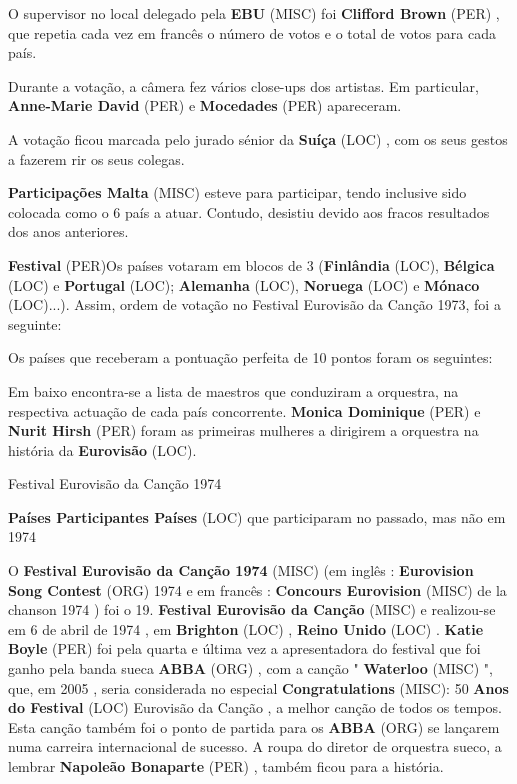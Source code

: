 \documentclass[12pt,a4paper]{article}
\begin{document}
O supervisor no local delegado pela \textbf{EBU} (MISC) foi \textbf{Clifford Brown} (PER) , que repetia cada vez em francês o número de votos e o total de votos para cada país.

Durante a votação, a câmera fez vários close-ups dos artistas. Em particular, \textbf{Anne-Marie David} (PER) e \textbf{Mocedades} (PER) apareceram.

A votação ficou marcada pelo jurado sénior da \textbf{Suíça} (LOC) , com os seus gestos a fazerem rir os seus colegas.



\textbf{Participações Malta} (MISC) esteve para participar, tendo inclusive sido colocada como o 6 país a atuar. Contudo, desistiu devido aos fracos resultados dos anos anteriores.



\textbf{Festival} (PER)Os países votaram em blocos de 3 (\textbf{Finlândia} (LOC), \textbf{Bélgica} (LOC) e \textbf{Portugal} (LOC); \textbf{Alemanha} (LOC), \textbf{Noruega} (LOC) e \textbf{Mónaco} (LOC)...). Assim, ordem de votação no Festival Eurovisão da Canção 1973, foi a seguinte:

Os países que receberam a pontuação perfeita de 10 pontos foram os seguintes:

Em baixo encontra-se a lista de maestros que conduziram a orquestra, na respectiva actuação de cada país concorrente. \textbf{Monica Dominique} (PER) e \textbf{Nurit Hirsh} (PER) foram as primeiras mulheres a dirigirem a orquestra na história da \textbf{Eurovisão} (LOC).



Festival Eurovisão da Canção 1974



\textbf{Países Participantes Países} (LOC) que participaram no passado, mas não em 1974

O \textbf{Festival Eurovisão da Canção 1974} (MISC) (em inglês : \textbf{Eurovision Song Contest} (ORG) 1974 e em francês : \textbf{Concours Eurovision} (MISC) de la chanson 1974 ) foi o 19. \textbf{Festival Eurovisão da Canção} (MISC) e realizou-se em 6 de abril de 1974 , em \textbf{Brighton} (LOC) , \textbf{Reino Unido} (LOC) . \textbf{Katie Boyle} (PER) foi pela quarta e última vez a apresentadora do festival que foi ganho pela banda sueca \textbf{ABBA} (ORG) , com a canção " \textbf{Waterloo} (MISC) ", que, em 2005 , seria considerada no especial \textbf{Congratulations} (MISC): 50 \textbf{Anos do Festival} (LOC) Eurovisão da Canção , a melhor canção de todos os tempos. Esta canção também foi o ponto de partida para os \textbf{ABBA} (ORG) se lançarem numa carreira internacional de sucesso. A roupa do diretor de orquestra sueco, a lembrar \textbf{Napoleão Bonaparte} (PER) , também ficou para a história.
\end{document}

